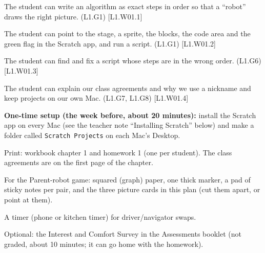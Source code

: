 
\begin{objectives}
  \item The student can write an algorithm as exact steps in order so that a \enquote{robot} draws the right picture. (L1.G1) [L1.W01.1]
  \item The student can point to the stage, a sprite, the blocks, the code area and the green flag in the Scratch app, and run a script. (L1.G1) [L1.W01.2]
  \item The student can find and fix a script whose steps are in the wrong order. (L1.G6) [L1.W01.3]
  \item The student can explain our class agreements and why we use a nickname and keep projects on our own Mac. (L1.G7, L1.G8) [L1.W01.4]
\end{objectives}

\begin{materials}
  \item \textbf{One-time setup (the week before, about 20 minutes):} install the Scratch app on every Mac (see the teacher note \enquote{Installing Scratch} below) and make a folder called \texttt{Scratch Projects} on each Mac's Desktop.
  \item Print: workbook chapter 1 and homework 1 (one per student). The class agreements are on the first page of the chapter.
  \item For the Parent-robot game: squared (graph) paper, one thick marker, a pad of sticky notes per pair, and the three picture cards in this plan (cut them apart, or point at them).
  \item A timer (phone or kitchen timer) for driver/navigator swaps.
  \item Optional: the Interest and Comfort Survey in the Assessments booklet (not graded, about 10 minutes; it can go home with the homework).
\end{materials}

